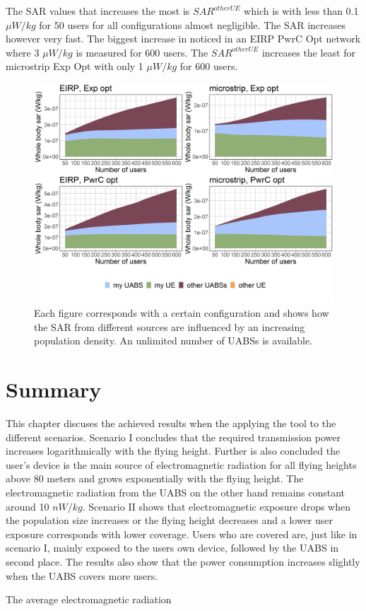 The \gls{SAR} values that increases the most is $SAR^{otherUE}$ which is with less than 0.1 $\mu W/kg$ for 50 users for all configurations
almost negligible. The \gls{SAR} increases however very fast. The biggest increase in noticed in an \gls{EIRP} \gls{PwrC Opt} network 
where 3 $\mu W/kg$ is measured for 600 users. The $SAR^{otherUE}$ increases the least for microstrip \gls{Exp Opt} with 
only 1 $\mu W/kg$ for 600 users.

\begin{figure}[h!]
  \includegraphics[width=\textwidth]{../results/s3/uFourSources.png}
  \caption{Each figure corresponds with a certain configuration and shows how the \acs{SAR} 
  from different sources are influenced by an increasing population density. An unlimited number of \acs{UABS}s is available.
  }
  \label{fig:s3b_fourSourcesMatrix}
\end{figure}


\section{Summary}

This chapter discuses the achieved results when the applying the tool to the different scenarios.
Scenario I concludes that the required transmission power increases logarithmically with the flying height.
Further is also concluded the user's device is the main source of electromagnetic radiation 
for all flying heights above 80 meters and grows exponentially with the flying height. The electromagnetic 
radiation from the \gls{UABS} on the other hand remains constant around 10 $nW/kg$.
Scenario II shows that electromagnetic exposure  drops when the population size increases or the flying height decreases
and a lower user exposure corresponds with lower coverage. Users who are covered are, just like in scenario I, 
mainly exposed to the users own device, followed by the \gls{UABS} in second place. The results also show that 
the power consumption increases slightly when the \gls{UABS} covers more users.

 The average electromagnetic radiation

